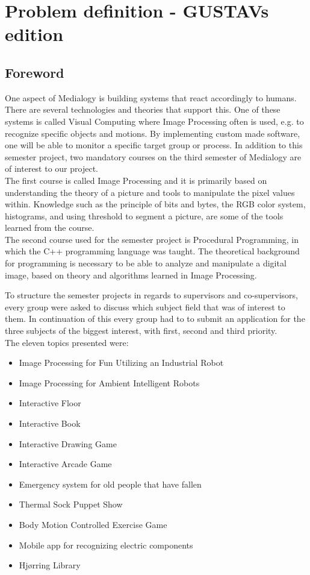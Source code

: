 \chapter{Problem definition - GUSTAVs edition}
\section{Foreword}
One aspect of Medialogy is building systems that react accordingly to humans. There are several technologies and theories that support this. One of these systems is called Visual Computing where Image Processing often is used, e.g. to recognize specific objects and motions. By implementing custom made software, one will be able to monitor a specific target group or process. In addition to this semester project, two mandatory courses on the third semester of Medialogy are of interest to our  project.\\
The first course is called Image Processing and it is primarily based on understanding the theory of a picture and tools to manipulate the pixel values within. Knowledge such as the principle of bits and bytes, the RGB color system, histograms, and using threshold to segment a picture, are some of the tools learned from the course.\\
The second course used for the semester project is Procedural Programming, in which the C++ programming language was taught. The theoretical background for programming is necessary to be able to analyze and manipulate a digital image, based on theory and algorithms learned in Image Processing.

To structure the semester projects in regards to supervisors and co-supervisors, every group were asked to discuss which subject field that was of interest to them. In continuation of this every group had to to submit an application for the three subjects of the biggest interest, with first, second and third priority.\\
The eleven topics presented were:

\begin{itemize}
\item Image Processing for Fun Utilizing an Industrial Robot
\item Image Processing for Ambient Intelligent Robots
\item Interactive Floor
\item Interactive Book
\item Interactive Drawing Game
\item Interactive Arcade Game
\item Emergency system for old people that have fallen
\item Thermal Sock Puppet Show
\item Body Motion Controlled Exercise Game
\item Mobile app for recognizing electric components
\item Hj{\o}rring Library
\end{itemize}


